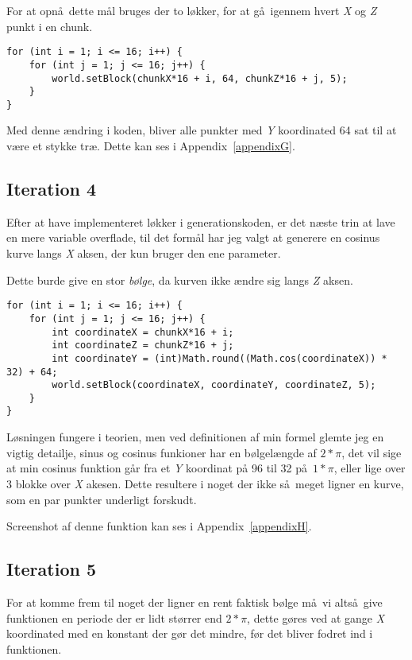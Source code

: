 \documentclass[a4paper,12pt]{report}
\begin{document}
			For at opn\aa \ dette m\aa l bruges der to l\o kker, for at g\aa \ igennem hvert \emph{X} og \emph{Z} punkt i en chunk.

\begin{lstlisting}[label=SRPWorldGenerator2,caption=SRPWorldGenerator.java]
for (int i = 1; i <= 16; i++) {
    for (int j = 1; j <= 16; j++) {
        world.setBlock(chunkX*16 + i, 64, chunkZ*16 + j, 5);
    }
}
\end{lstlisting}

			Med denne \ae ndring i koden, bliver alle punkter med \emph{Y} koordinated 64 sat til at v\ae re et stykke tr\ae .
			Dette kan ses i Appendix~\ref{appendixG}.
		\subsection{Iteration 4}
			Efter at have implementeret l\o kker i generationskoden, er det n\ae ste trin at lave en mere variable overflade,
			til det form\aa l har jeg valgt at generere en cosinus kurve langs \emph{X} aksen, der kun bruger den ene parameter.

			Dette burde give en stor \emph{b\o lge}, da kurven ikke \ae ndre sig langs \emph{Z} aksen.

\begin{lstlisting}[label=SRPWorldGenerator3,caption=SRPWorldGenerator.java]
for (int i = 1; i <= 16; i++) {
    for (int j = 1; j <= 16; j++) {
        int coordinateX = chunkX*16 + i;
        int coordinateZ = chunkZ*16 + j;
        int coordinateY = (int)Math.round((Math.cos(coordinateX)) * 32) + 64;
        world.setBlock(coordinateX, coordinateY, coordinateZ, 5);
    }
}
\end{lstlisting}
	
			L\o sningen fungere i teorien, men ved definitionen af min formel glemte jeg en vigtig detailje, sinus og cosinus funkioner har
			en b\o lgel\ae ngde af \(2 * \pi \), det vil sige at min cosinus funktion g\aa r fra et \emph{Y} koordinat på 96 til 32 p\aa \ \(1 * \pi \),
			eller lige over 3 blokke over \emph{X} akesen. Dette resultere i noget der ikke s\aa \ meget ligner en kurve, som en par punkter underligt
			forskudt.

			Screenshot af denne funktion kan ses i Appendix~\ref{appendixH}.
		\subsection{Iteration 5}
			For at komme frem til noget der ligner en rent faktisk b\o lge m\aa \ vi alts\aa \ give funktionen en periode der er lidt st\o rrer
			end \(2 * \pi \), dette gøres ved at gange \emph{X} koordinated med en konstant der g\o r det mindre, f\o r det bliver fodret
			ind i funktionen.
\end{document}
